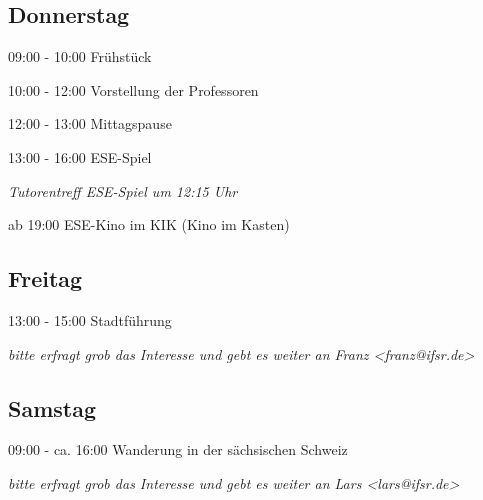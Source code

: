\documentclass[a4paper,12pt]{report}
\begin{document}
\subsection{Donnerstag}
\begin{itemize*}
\item 09:00 - 10:00 Frühstück
\item 10:00 - 12:00 Vorstellung der Professoren
\item 12:00 - 13:00 Mittagspause
\item 13:00 - 16:00 ESE-Spiel
\begin{itemize*}
  \item \small{\textit{Tutorentreff ESE-Spiel um 12:15 Uhr}}
\end{itemize*}
\item ab 19:00 ESE-Kino im KIK (Kino im Kasten)
\end{itemize*}

\subsection{Freitag}
\begin{itemize*}
\item 13:00 - 15:00 Stadtführung
\begin{itemize*}
  \item \small{\textit{bitte erfragt grob das Interesse und gebt es weiter an Franz <franz@ifsr.de>}}
\end{itemize*}
\end{itemize*}

\subsection{Samstag}
\begin{itemize*}
\item 09:00 - ca. 16:00 Wanderung in der sächsischen Schweiz
\begin{itemize*}
  \item \small{\textit{bitte erfragt grob das Interesse und gebt es weiter an Lars <lars@ifsr.de>}}
\end{itemize*}
\end{itemize*}
\end{document}
